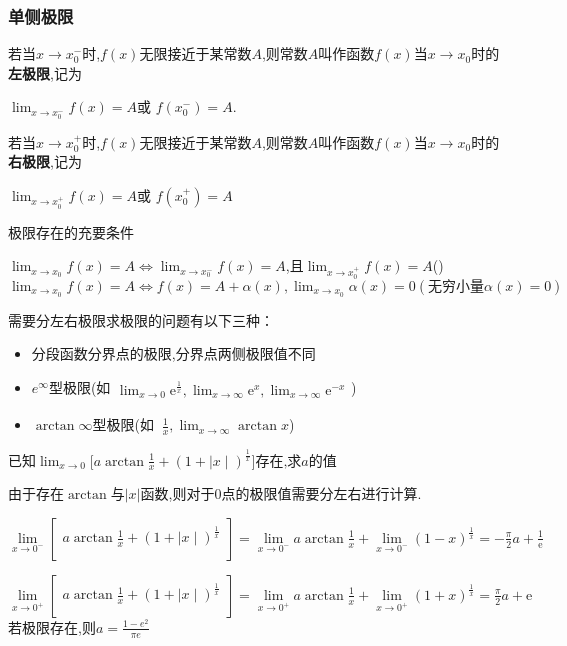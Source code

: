 \documentclass[12pt, a4paper, oneside, UTF8]{ctexbook}  %
\begin{document}
\subsubsection{单侧极限}
\begin{defn}{}{}
    若当$x\to x_0^{-}$时,$f(x)$无限接近于某常数$A$,则常数$A$叫作函数$f(x)$当$x\to x_0$时的\textbf{左极限},记为
    \begin{center}
        $\operatorname*{lim}_{x\to x_0^{-}}f(x)=A$或 $f(x_0^{-})=A$.
    \end{center}
    若当$x\to x_0^+$时,$f(x)$无限接近于某常数$A$,则常数$A$叫作函数$f(x)$当$x\to x_0$时的\textbf{右极限},记为
    \begin{center}
        $\operatorname*{lim}_{x\to x_0^{+}}f(x)=A$或 $f(x_0^{+})=A$
    \end{center}
    极限存在的充要条件
    \begin{center}
        $\lim_{x\to x_0}f(x)=A\Leftrightarrow\lim_{x\to x_0^-}f(x)=A$,且$\lim_{x\to x_0^+}f(x)=A$()
        $\lim_{x\to x_0}f(x)=A\Leftrightarrow f(x)=A+\alpha(x),\lim_{x\to x_0}\alpha(x)=0(\text{无穷小量}\alpha(x)=0)$
    \end{center}
\end{defn}
\begin{criterion}{}{}
    需要分左右极限求极限的问题有以下三种：
    \begin{itemize}
        \item 分段函数分界点的极限,分界点两侧极限值不同
        \item $e^\infty$型极限(如$\begin{aligned}\lim_{x\to0}\mathrm{e}^{\frac{1}{x}},\lim_{x\to\infty}\mathrm{e}^{x},\lim_{x\to\infty}\mathrm{e}^{-x}\end{aligned}$)
        \item $\arctan\infty $型极限(如$\mathop{\mathrm{\lim_{x\to0} \arctan}}\frac{1}{x},\operatorname*{lim}_{x\to\infty}\arctan x$)
    \end{itemize}
\end{criterion}


\begin{problem}
$\text{已知}\lim_{x\to0}\biggl[a\arctan\frac{1}{x}+(1+\mid x\mid)^{\frac{1}{x}}\biggr]\text{存在,求}a\text{的值}$
\end{problem}
\begin{solution}
    由于存在$\arctan$与$|x|$函数,则对于0点的极限值需要分左右进行计算.

    $\lim\limits_{x\to0^{-}}\left[\begin{matrix}a\arctan\frac{1}{x}+(1+\mid x\mid)^{\frac{1}{x}}\\\end{matrix}\right]=\lim\limits_{x\to0^{-}}a\arctan\frac{1}{x}+\lim\limits_{x\to0^{-}}(1-x)^{\frac{1}{x}}=-\frac{\pi}{2}a+\frac{1}{\text{e}}$

    $\lim\limits_{x\to0^+}\left[\begin{matrix}a\arctan\frac{1}{x}+(1+\mid x\mid)^{\frac{1}{x}}\\\end{matrix}\right]=\lim\limits_{x\to0^+}a\arctan\frac{1}{x}+\lim\limits_{x\to0^+}(1+x)^{\frac{1}{x}}=\frac{\pi}{2}a+\mathrm{e}$
    若极限存在,则$a=\frac{1-e^2}{\pi e}$
\end{solution}
\end{document}
